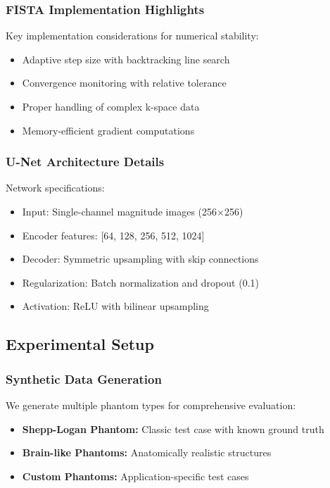 \documentclass[11pt,a4paper]{article}
\begin{document}
\subsubsection{FISTA Implementation Highlights}

Key implementation considerations for numerical stability:
\begin{itemize}
    \item Adaptive step size with backtracking line search
    \item Convergence monitoring with relative tolerance
    \item Proper handling of complex k-space data
    \item Memory-efficient gradient computations
\end{itemize}

\subsubsection{U-Net Architecture Details}

Network specifications:
\begin{itemize}
    \item Input: Single-channel magnitude images (256×256)
    \item Encoder features: [64, 128, 256, 512, 1024]
    \item Decoder: Symmetric upsampling with skip connections
    \item Regularization: Batch normalization and dropout (0.1)
    \item Activation: ReLU with bilinear upsampling
\end{itemize}

\subsection{Experimental Setup}

\subsubsection{Synthetic Data Generation}

We generate multiple phantom types for comprehensive evaluation:

\begin{itemize}
    \item \textbf{Shepp-Logan Phantom:} Classic test case with known ground truth
    \item \textbf{Brain-like Phantoms:} Anatomically realistic structures
    \item \textbf{Custom Phantoms:} Application-specific test cases
\end{itemize}
\end{document}
